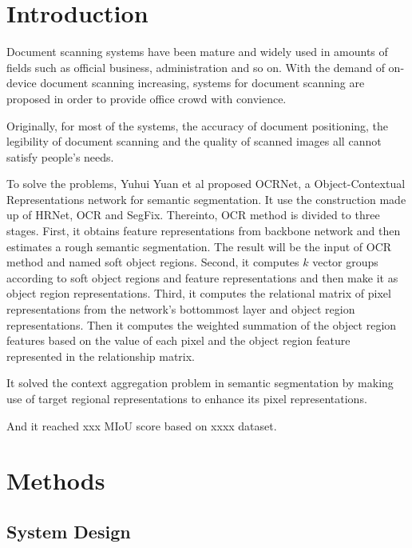 \documentclass[10pt, conference, compsocconf]{IEEEtran}
\begin{document}
	\section{Introduction}
	

	Document scanning systems have been mature and widely used in amounts of fields such as official business, administration and so on. 
	With the demand of on-device document scanning increasing, systems for document scanning are proposed in order to provide office crowd with convience. 


	Originally, for most of the systems, the accuracy of document positioning, the legibility of document scanning and the quality of scanned images all cannot satisfy people's needs. 


	To solve the problems, Yuhui Yuan et al proposed OCRNet, a Object-Contextual Representations network for semantic segmentation. 
	It use the construction made up of HRNet, OCR and SegFix. 
	Thereinto, OCR method is divided to three stages. 
	First, it obtains feature representations from backbone network and then estimates a rough semantic segmentation. 
	The result will be the input of OCR method and named soft object regions.
	Second, it computes $k$ vector groups according to soft object regions and feature representations and then make it as object region representations. 
	Third, it computes the relational matrix of pixel representations from the network's bottommost layer and object region representations. 
	Then it computes the weighted summation of the object region features based on the value of each pixel and the object region feature represented in the relationship matrix. 



	It solved the context aggregation problem in semantic segmentation by making use of target regional representations to enhance its pixel representations. 


	And it reached xxx MIoU score based on xxxx dataset.

	
	\section{Methods}
		\subsection{System Design}
\end{document}
